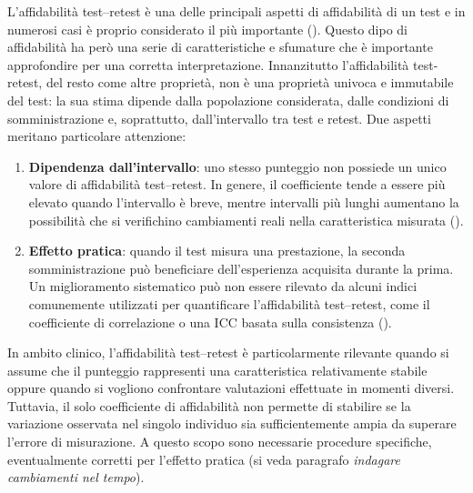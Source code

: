 \documentclass[
  italian,
  letterpaper,
  paper=A4,
  headinclude=on,
  footinclude=on,
  12pt]{scrbook}
\providecommand{\tightlist}{%
  \setlength{\itemsep}{0pt}\setlength{\parskip}{0pt}}
\begin{document}
L'affidabilità test--retest è una delle principali aspetti di
affidabilità di un test e in numerosi casi è proprio considerato il più
importante (\cite{slick2006psychometrics}). Questo dipo di affidabilità
ha però una serie di caratteristiche e sfumature che è importante
approfondire per una corretta interpretazione. Innanzitutto
l'affidabilità test-retest, del resto come altre proprietà, non è una
proprietà univoca e immutabile del test: la sua stima dipende dalla
popolazione considerata, dalle condizioni di somministrazione e,
soprattutto, dall'intervallo tra test e retest. Due aspetti meritano
particolare attenzione:

\begin{enumerate}
\def\labelenumi{\arabic{enumi}.}
\tightlist
\item
  \textbf{Dipendenza dall'intervallo}: uno stesso punteggio non possiede
  un unico valore di affidabilità test--retest. In genere, il
  coefficiente tende a essere più elevato quando l'intervallo è breve,
  mentre intervalli più lunghi aumentano la possibilità che si
  verifichino cambiamenti reali nella caratteristica misurata
  (\cite{slick2006psychometrics}).
\item
  \textbf{Effetto pratica}: quando il test misura una prestazione, la
  seconda somministrazione può beneficiare dell'esperienza acquisita
  durante la prima. Un miglioramento sistematico può non essere rilevato
  da alcuni indici comunemente utilizzati per quantificare
  l'affidabilità test--retest, come il coefficiente di correlazione o
  una ICC basata sulla consistenza (\cite{slick2006psychometrics}).
\end{enumerate}

In ambito clinico, l'affidabilità test--retest è particolarmente
rilevante quando si assume che il punteggio rappresenti una
caratteristica relativamente stabile oppure quando si vogliono
confrontare valutazioni effettuate in momenti diversi. Tuttavia, il solo
coefficiente di affidabilità non permette di stabilire se la variazione
osservata nel singolo individuo sia sufficientemente ampia da superare
l'errore di misurazione. A questo scopo sono necessarie procedure
specifiche, eventualmente corretti per l'effetto pratica (si veda
paragrafo \emph{indagare cambiamenti nel tempo}).
\end{document}

